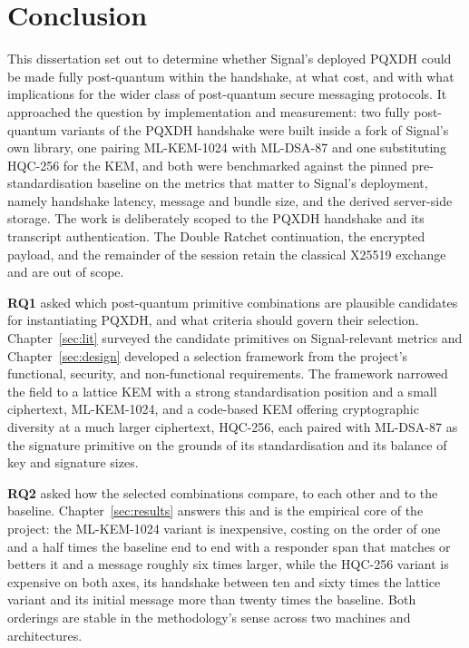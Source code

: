 \section{Conclusion}
\label{sec:conclusion}

This dissertation set out to determine whether Signal's deployed PQXDH could be made fully post-quantum within the handshake, at what cost, and with what implications for the wider class of post-quantum secure messaging protocols. It approached the question by implementation and measurement: two fully post-quantum variants of the PQXDH handshake were built inside a fork of Signal's own library, one pairing ML-KEM-1024 with ML-DSA-87 and one substituting HQC-256 for the KEM, and both were benchmarked against the pinned pre-standardisation baseline on the metrics that matter to Signal's deployment, namely handshake latency, message and bundle size, and the derived server-side storage. The work is deliberately scoped to the PQXDH handshake and its transcript authentication. The Double Ratchet continuation, the encrypted payload, and the remainder of the session retain the classical X25519 exchange and are out of scope.

\textbf{RQ1} asked which post-quantum primitive combinations are plausible candidates for instantiating PQXDH, and what criteria should govern their selection. Chapter~\ref{sec:lit} surveyed the candidate primitives on Signal-relevant metrics and Chapter~\ref{sec:design} developed a selection framework from the project's functional, security, and non-functional requirements. The framework narrowed the field to a lattice KEM with a strong standardisation position and a small ciphertext, ML-KEM-1024, and a code-based KEM offering cryptographic diversity at a much larger ciphertext, HQC-256, each paired with ML-DSA-87 as the signature primitive on the grounds of its standardisation and its balance of key and signature sizes.

\textbf{RQ2} asked how the selected combinations compare, to each other and to the baseline. Chapter~\ref{sec:results} answers this and is the empirical core of the project: the ML-KEM-1024 variant is inexpensive, costing on the order of one and a half times the baseline end to end with a responder span that matches or betters it and a message roughly six times larger, while the HQC-256 variant is expensive on both axes, its handshake between ten and sixty times the lattice variant and its initial message more than twenty times the baseline. Both orderings are stable in the methodology's sense across two machines and architectures.

